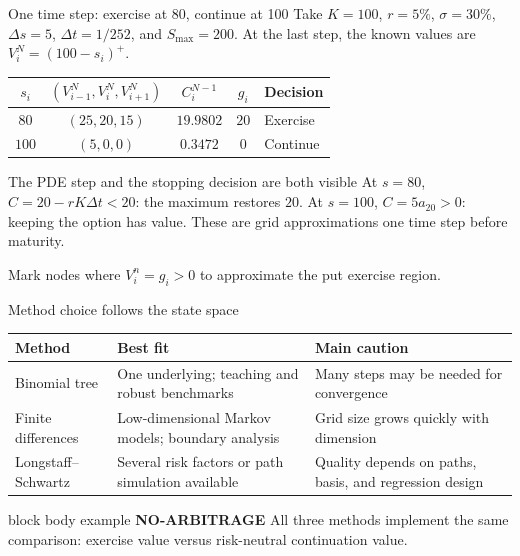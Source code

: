 \documentclass[handout,10pt,aspectratio=169]{beamer}
\newenvironment{marketbox}{\begin{beamercolorbox}[rounded=true,sep=0.7em,wd=\textwidth]{block body example}
  \textbf{\color{CourseGreen}NO-ARBITRAGE}\quad}{\end{beamercolorbox}}
\begin{document}
\begin{frame}{One time step: exercise at 80, continue at 100}
Take \(K=100\), \(r=5\%\), \(\sigma=30\%\),
\(\Delta s=5\), \(\Delta t=1/252\), and \(S_{\max}=200\).
At the last step, the known values are \(V_i^N=(100-s_i)^+\).
\medskip
\begin{center}
\begin{tabular}{c|c|c|c|l}
\toprule
\(s_i\) & \((V_{i-1}^N,V_i^N,V_{i+1}^N)\) & \(C_i^{N-1}\) & \(g_i\) & Decision\\
\midrule
\(80\) & \((25,20,15)\) & \(19.9802\) & \(20\) & Exercise\\
\(100\) & \((5,0,0)\) & \(0.3472\) & \(0\) & Continue\\
\bottomrule
\end{tabular}
\end{center}
\begin{block}{The PDE step and the stopping decision are both visible}
At \(s=80\), \(C=20-rK\Delta t<20\): the maximum restores \(20\).
At \(s=100\), \(C=5a_{20}>0\): keeping the option has value.
These are grid approximations one time step before maturity.
\end{block}
Mark nodes where \(V_i^n=g_i>0\) to approximate the put exercise region.
\end{frame}

\begin{frame}{Method choice follows the state space}
\begin{center}
\begin{tabular}{p{}|p{}|p{}}
\toprule
Method & Best fit & Main caution\\
\midrule
Binomial tree & One underlying; teaching and robust benchmarks & Many steps may be needed for convergence\\
Finite differences & Low-dimensional Markov models; boundary analysis & Grid size grows quickly with dimension\\
Longstaff--Schwartz & Several risk factors or path simulation available & Quality depends on paths, basis, and regression design\\
\bottomrule
\end{tabular}
\end{center}
\begin{marketbox}
All three methods implement the same comparison: exercise value versus
risk-neutral continuation value.
\end{marketbox}
\end{frame}
\end{document}
